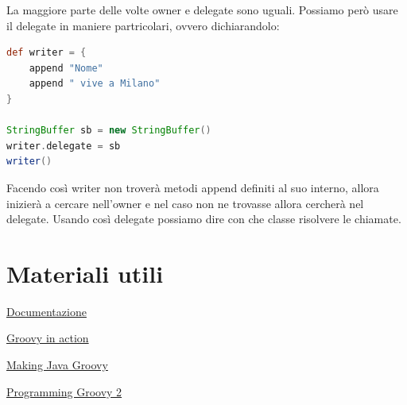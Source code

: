 \documentclass[11pt,a4paper]{book}
\begin{document}
La maggiore parte delle volte owner e delegate sono uguali. Possiamo però usare il delegate in maniere partricolari, ovvero dichiarandolo:
\begin{lstlisting}[language = groovy]
def writer = {
    append "Nome"
    append " vive a Milano"
}

StringBuffer sb = new StringBuffer()
writer.delegate = sb
writer()
\end{lstlisting}

Facendo così writer non troverà metodi append definiti al suo interno, allora inizierà a cercare nell'owner e nel caso non ne trovasse allora cercherà nel delegate. Usando così delegate possiamo dire con che classe risolvere le chiamate.
\chapter{Materiali utili}
\href{https://groovy-lang.org/}{Documentazione}

\href{https://www.manning.com/books/groovy-in-action-second-edition}{Groovy in action}

\href{https://www.manning.com/books/making-java-groovy}{Making Java Groovy}

\href{https://pragprog.com/titles/vslg2/programming-groovy-2/}{Programming Groovy 2}
\end{document}
